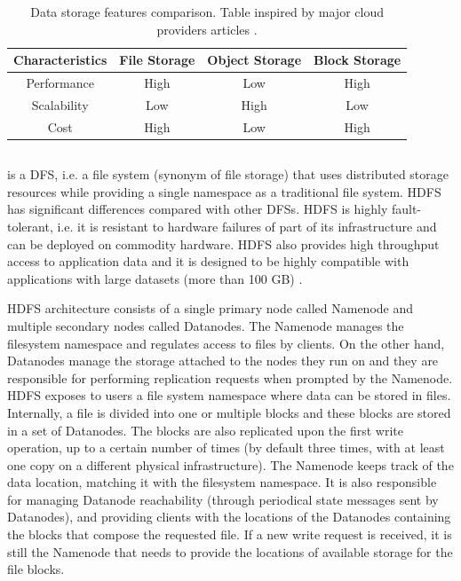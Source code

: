 \begin{table}[!ht]
    \begin{center}
      \caption[Data storage features comparison]{Data storage features comparison. Table inspired by major cloud providers articles \cite{BlockVsFile,HowObjectVs}.}
      \label{tab:storagecomparison}
      \begin{tabular}{cccc} %
        \toprule
        \textbf{Characteristics}\Tstrut\Bstrut & \textbf{File Storage} & \textbf{Object Storage} & \textbf{Block Storage}\\
        \midrule
        Performance & High & Low & High\Tstrut\\
        Scalability & Low & High & Low\\
        Cost & High & Low & High\Bstrut\\
        \bottomrule
      \end{tabular}
    \end{center}
\end{table}

\subsection{}

 is a \gls{DFS}, i.e. a file system (synonym of file storage) that uses distributed storage resources while providing a single namespace as a traditional file system. \gls{HDFS} has significant differences compared with other \glspl{DFS}. \gls{HDFS} is highly fault-tolerant, i.e. it is resistant to hardware failures of part of its infrastructure and can be deployed on commodity hardware. \gls{HDFS} also provides high throughput access to application data and it is designed to be highly compatible with applications with large datasets (more than 100 GB) \cite{borthakurHadoopDistributedFile2005}. 

\gls{HDFS} architecture consists of a single primary node called Namenode and multiple secondary nodes called Datanodes. The Namenode manages the filesystem namespace and regulates access to files by clients. On the other hand, Datanodes manage the storage attached to the nodes they run on and they are responsible for performing replication requests when prompted by the Namenode. \gls{HDFS} exposes to users a file system namespace where data can be stored in files. Internally, a file is divided into one or multiple blocks and these blocks are stored in a set of Datanodes. The blocks are also replicated upon the first write operation, up to a certain number of times (by default three times, with at least one copy on a different physical infrastructure). The Namenode keeps track of the data location, matching it with the filesystem namespace. It is also responsible for managing Datanode reachability (through periodical state messages sent by Datanodes), and providing clients with the locations of the Datanodes containing the blocks that compose the requested file. If a new write request is received, it is still the Namenode that needs to provide the locations of available storage for the file blocks. 

